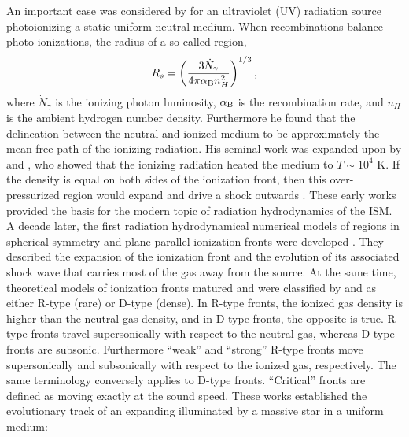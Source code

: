 \documentclass[useAMS,usenatbib]{mn2e}
\begin{document}
An important case was considered by \citet{Stroemgren39} for an
ultraviolet (UV) radiation source photoionizing a static uniform
neutral medium.  When recombinations balance photo-ionizations, the
radius of a so-called \hii region,
%
\begin{equation}
  \label{eqn:Rstr}
  R_s = \left(\frac{3\dot{N}_\gamma}{4\pi \alpha_{\rm B} n_H^2}\right)^{1/3},
\end{equation}
where $\dot{N}_\gamma$ is the ionizing photon luminosity, $\alpha_{\rm
  B}$ is the recombination rate, and $n_H$ is the ambient hydrogen
number density.  Furthermore he found that the delineation between the
neutral and ionized medium to be approximately the mean free path of
the ionizing radiation.  His seminal work was expanded upon by
\citet{Spitzer48, Spitzer49, Spitzer54} and \citet{Spitzer50}, who
showed that the ionizing radiation heated the medium to $T \sim 10^4$
K.  If the density is equal on both sides of the ionization front,
then this over-pressurized region would expand and drive a shock
outwards \citep[e.g.][]{Oort54, Schatzman55}.  These early works
provided the basis for the modern topic of radiation hydrodynamics of
the ISM.  A decade later, the first radiation hydrodynamical numerical
models of \hii regions in spherical symmetry and plane-parallel
ionization fronts were developed \citep[e.g.][]{Mathews65, Lasker66,
  Hjellming66}.  They described the expansion of the ionization front
and the evolution of its associated shock wave that carries most of
the gas away from the source.  At the same time, theoretical models of
ionization fronts matured and were classified by \citet{Kahn54} and
\citet{Axford61} as either R-type (rare) or D-type (dense).  In R-type
fronts, the ionized gas density is higher than the neutral gas
density, and in D-type fronts, the opposite is true.  R-type fronts
travel supersonically with respect to the neutral gas, whereas D-type
fronts are subsonic.  Furthermore ``weak'' and ``strong'' R-type
fronts move supersonically and subsonically with respect to the
ionized gas, respectively.  The same terminology conversely applies to
D-type fronts.  ``Critical'' fronts are defined as moving exactly at
the sound speed.  These works established the evolutionary track of an
expanding \hii illuminated by a massive star in a uniform medium:
%
\end{document}
